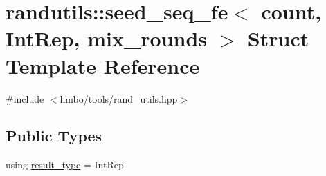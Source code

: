 \hypertarget{structrandutils_1_1seed__seq__fe}{}\section{randutils\+:\+:seed\+\_\+seq\+\_\+fe$<$ count, Int\+Rep, mix\+\_\+rounds $>$ Struct Template Reference}
\label{structrandutils_1_1seed__seq__fe}


{\ttfamily \#include $<$limbo/tools/rand\+\_\+utils.\+hpp$>$}

\subsection*{Public Types}
\begin{DoxyCompactItemize}
\item 
using \hyperlink{structrandutils_1_1seed__seq__fe_aa43f3052c2135285319c38abab35da2a}{result\+\_\+type} = Int\+Rep
\end{DoxyCompactItemize}
